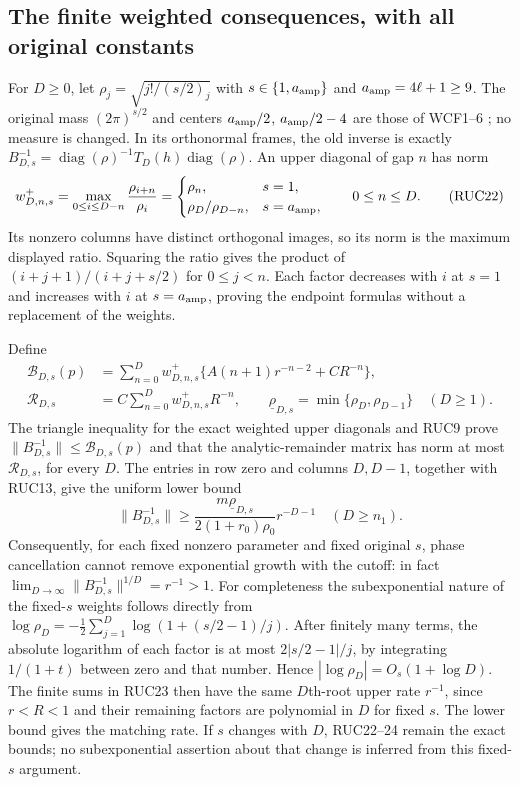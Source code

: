 \documentclass[11pt]{article}
\begin{document}
\subsection{The finite weighted consequences, with all original constants}

For $D\ge0$, let $\rho_j=\sqrt{j!/(s/2)_j}$ with
$s\in\{1,a_{\rm amp}\}$ and $a_{\rm amp}=4\ell+1\ge9$.
The original mass $(2\pi)^{s/2}$ and centers
$a_{\rm amp}/2$, $a_{\rm amp}/2-4$ are those of WCF1--6
\cite{WCF}; no measure is changed.  In its orthonormal frames,
the old inverse is exactly
$B_{D,s}^{-1}=\operatorname{diag}(\rho)^{-1}T_D(h)
\operatorname{diag}(\rho)$.
An upper diagonal of gap $n$ has norm
\[
 w^+_{D,n,s}=\max_{0\le i\le D-n}\frac{\rho_{i+n}}{\rho_i}
 =\begin{cases}\rho_n,&s=1,\\
                 \rho_D/\rho_{D-n},&s=a_{\rm amp},
   \end{cases}\qquad 0\le n\le D.
 \tag{RUC22}
\]
Its nonzero columns have distinct orthogonal images, so its norm
is the maximum displayed ratio.  Squaring the ratio gives the
product of $(i+j+1)/(i+j+s/2)$ for $0\le j<n$.
Each factor decreases with $i$ at $s=1$ and increases with $i$
at $s=a_{\rm amp}$, proving the endpoint formulas without a
replacement of the weights.

Define
\[
 \begin{aligned}
 \mathcal B_{D,s}(p)&=\sum_{n=0}^D w^+_{D,n,s}
           \{A(n+1)r^{-n-2}+CR^{-n}\},\\
 \mathcal R_{D,s}&=C\sum_{n=0}^D w^+_{D,n,s}R^{-n},\qquad
 \underline\rho_{D,s}=\min\{\rho_D,\rho_{D-1}\}\quad(D\ge1).
 \end{aligned}\tag{RUC23}
\]
The triangle inequality for the exact weighted upper diagonals
and RUC9 prove $\|B_{D,s}^{-1}\|\le\mathcal B_{D,s}(p)$ and
that the analytic-remainder matrix has norm at most
$\mathcal R_{D,s}$, for every $D$.  The entries in row zero and
columns $D,D-1$, together with RUC13, give the uniform lower bound
\[
 \|B_{D,s}^{-1}\|
 \ge\frac{m\underline\rho_{D,s}}{2(1+r_0)\rho_0}
          r^{-D-1}\quad(D\ge n_1).
 \tag{RUC24}
\]
Consequently, for each fixed nonzero parameter and fixed original
$s$, phase cancellation cannot remove exponential growth with
the cutoff: in fact
$\lim_{D\to\infty}\|B_{D,s}^{-1}\|^{1/D}=r^{-1}>1$.
For completeness the subexponential nature of the fixed-$s$
weights follows directly from
$\log\rho_D=-\frac12\sum_{j=1}^D\log(1+(s/2-1)/j)$.
After finitely many terms, the absolute logarithm of each factor
is at most $2|s/2-1|/j$, by integrating $1/(1+t)$ between zero
and that number.  Hence $|\log\rho_D|=O_s(1+\log D)$.
The finite sums in RUC23 then have the same $D$th-root upper
rate $r^{-1}$, since $r<R<1$ and their remaining factors are
polynomial in $D$ for fixed $s$.  The lower bound gives the
matching rate.  If $s$ changes with $D$, RUC22--24 remain the
exact bounds; no subexponential assertion about that change is
inferred from this fixed-$s$ argument.
\end{document}
